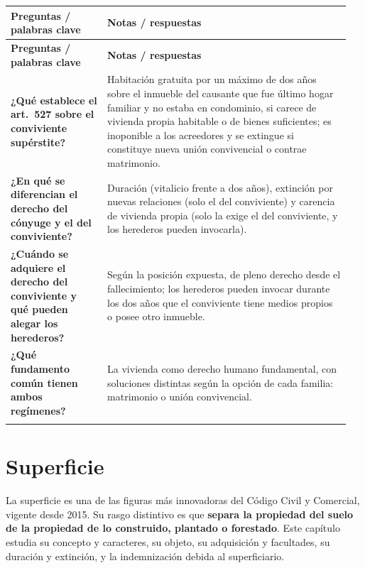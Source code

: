 \documentclass[12pt,oneside]{book}
\makeatletter
\newenvironment{cornell}{%
    \par\vspace{0.5em}
    \noindent
    \begin{longtable}{@{}>{\raggedright\arraybackslash}p{0.27\linewidth}
                         >{\raggedright\arraybackslash}p{0.68\linewidth}@{}}
    \toprule
    \textbf{Preguntas / palabras clave} & \textbf{Notas / respuestas} \\
    \midrule
    \endfirsthead
    \toprule
    \textbf{Preguntas / palabras clave} & \textbf{Notas / respuestas} \\
    \midrule
    \endhead
}{%
    \bottomrule
    \end{longtable}
}
\newcommand{\cornellsummary}[1]{%
    \midrule
    \multicolumn{2}{@{}p{\dimexpr0.95\linewidth+2\tabcolsep\relax}@{}}{%
        \vspace{0.2em}\textbf{Resumen:} #1\vspace{0.2em}} \\
}
\makeatother
\begin{document}
\begin{cornell}
\textbf{¿Qué establece el art.~527 sobre el conviviente supérstite?} &
Habitación gratuita por un máximo de dos años sobre el inmueble del causante que fue último hogar familiar y no estaba en condominio, si carece de vivienda propia habitable o de bienes suficientes; es inoponible a los acreedores y se extingue si constituye nueva unión convivencial o contrae matrimonio. \\

\textbf{¿En qué se diferencian el derecho del cónyuge y el del conviviente?} &
Duración (vitalicio frente a dos años), extinción por nuevas relaciones (solo el del conviviente) y carencia de vivienda propia (solo la exige el del conviviente, y los herederos pueden invocarla). \\

\textbf{¿Cuándo se adquiere el derecho del conviviente y qué pueden alegar los herederos?} &
Según la posición expuesta, de pleno derecho desde el fallecimiento; los herederos pueden invocar durante los dos años que el conviviente tiene medios propios o posee otro inmueble. \\

\textbf{¿Qué fundamento común tienen ambos regímenes?} &
La vivienda como derecho humano fundamental, con soluciones distintas según la opción de cada familia: matrimonio o unión convivencial. \\

\cornellsummary{El cónyuge supérstite tiene un derecho real de habitación vitalicio, gratuito y de pleno derecho sobre el último hogar conyugal de propiedad exclusiva del causante (arts.~2383 y 1894), inoponible a los acreedores del causante, que superó las limitaciones del art.~3574 bis. El conviviente supérstite tiene, según el art.~527, un derecho gratuito de hasta dos años, sujeto a carencia de vivienda propia y extinguible por nueva unión o matrimonio. Ambos regímenes se fundan en la protección de la vivienda como derecho humano fundamental.}
\end{cornell}

\chapter{Superficie}\label{cap:superficie}

La superficie es una de las figuras más innovadoras del Código Civil y Comercial, vigente desde 2015. Su rasgo distintivo es que \textbf{separa la propiedad del suelo de la propiedad de lo construido, plantado o forestado}. Este capítulo estudia su concepto y caracteres, su objeto, su adquisición y facultades, su duración y extinción, y la indemnización debida al superficiario.
\end{document}
